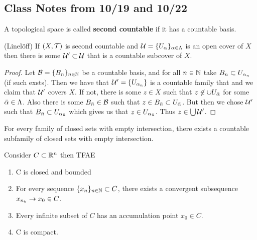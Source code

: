 \setcounter{section}{1019}
\setcounter{thm}{0}
\subsection{Class Notes from 10/19 and 10/22}\nl


\vs

\dfn A topological space is called \textbf{second countable} if it has a countable basis.

\vs

\begin{thm}(Linel\"off) If $(X, \mathcal{T})$ is second countable and $\mathcal{U} = \{U_\alpha\}_{\alpha\in \Lambda}$ is an open cover of $X$ then there is some $\mathcal{U}^\prime\subset \mathcal{U}$ that is a countable subcover of $X$.
\end{thm}

\begin{proof}
Let $\mathcal{B} = \{B_n\}_{n\in \mathbb{N}}$ be a countable basis, and for all $n\in \mathbb{N}$ take $B_n \subset U_{\alpha_n}$ (if such exsts). Then we have that $\mathcal{U}^\prime = \{U_{\alpha_n}\}$ is a countable family that and we claim that $\mathcal{U}^\prime$ covers $X$. If not, there is some $z\in X$ such that $z\not\in \cup U_{\bar {\alpha}}$ for some $\bar {\alpha} \in \Lambda$. Also there is some $B_{\bar n}\in \mathcal{B}$ such that $z\in B_{\bar n}\subset U_{\bar {\alpha}}$. But then we chose $\mathcal{U}^\prime$ such that $B_{\bar n} \subset U_{\alpha_{\bar n}}$ which gives us that $z \in U_{\alpha_{\bar n}}$. Thus $z\in \bigcup \mathcal{U}^\prime$.
\end{proof}

\vs

\begin{thm}
For every family of closed sets with empty intersection, there exists a countable subfamily of closed sets with empty intersection.
\end{thm}

\vs
\begin{thm} Consider $C\subset \mathbb{R}^n$ then TFAE
\begin{enumerate}[\hspace{1em}(a)]
    \item C is closed and bounded
    \item For every sequence $\{x_n\}_{n\in \mathbb{N}} \subset C$, there exists a convergent subsequence $x_{n_k}\rightarrow x_0\in C$.
    \item Every infinite subset of $C$ has an accumulation point $x_0\in C$.
    \item C is compact.
\end{enumerate}

\end{thm}

